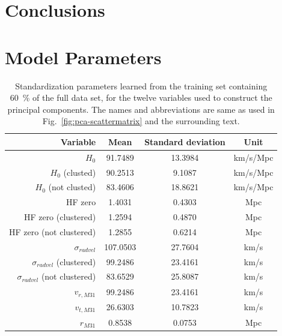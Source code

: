 \documentclass[english, oneside]{HYgradu}
\begin{document}
\chapter{Conclusions}






\clearpage
{} %



\newpage
\appendix
\chapter{Model Parameters} \label{app:parameters}
\begin{table}[ht]
	\centering
	\begin{tabular}{ r | c c c }
	    	Variable & Mean & Standard deviation & Unit \\
	    	\hline
			$H_0$ & 91.7489 & 13.3984 & km/s/Mpc \\
			$H_0$ (clusted) & 90.2513 & 9.1087 & km/s/Mpc \\
			$H_0$ (not clusted) & 83.4606 & 18.8621 & km/s/Mpc \\
			HF zero & 1.4031 & 0.4303 & Mpc \\
			HF zero (clustered) & 1.2594 & 0.4870 & Mpc \\
			HF zero (not clustered) & 1.2855 & 0.6214 & Mpc \\
			$\sigma_{radvel}$ & 107.0503 & 27.7604 & km/s \\
			$\sigma_{radvel}$ (clustered) & 99.2486 & 23.4161 & km/s \\
			$\sigma_{radvel}$ (not clustered) & 83.6529 & 25.8087 & km/s \\
			$v_{r, M31}$ & 99.2486 & 23.4161 & km/s \\
			$v_{t, M31}$ & 26.6303 & 10.7823 & km/s \\
			$r_{M31}$ & 0.8538 & 0.0753 & Mpc \\
	\end{tabular}
	\caption{Standardization parameters learned from the training set containing 60~\% of the full data set, for the twelve variables used to construct the principal components. The names and abbreviations are same as used in Fig.~\ref{fig:pca-scattermatrix} and the surrounding text.} \label{tab:standardizing}
\end{table}
\end{document}
